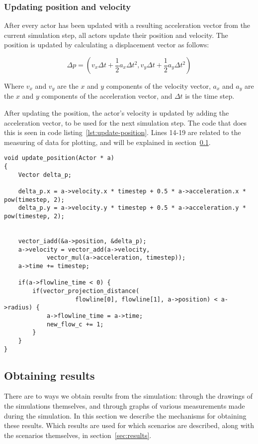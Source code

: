 \subsubsection{Updating position and velocity}
After every actor has been updated with a resulting acceleration vector from 
the current simulation step, all actors update their position and velocity.  
The position is updated by calculating a displacement vector as follows:

\begin{equation}
    \Delta p = (v_x \Delta t + \frac{1}{2}a_x \Delta t^2, v_y \Delta t + 
    \frac{1}{2}a_y \Delta t^2)
\end{equation}

Where $v_x$ and $v_y$ are the $x$ and $y$ components of the velocity vector, 
$a_x$ and $a_y$ are the $x$ and $y$ components of the acceleration vector, and 
$\Delta t$ is the time step.

After updating the position, the actor's velocity is updated by adding the 
acceleration vector, to be used for the next simulation step. The code that 
does this is seen in code listing~\ref{lst:update-position}. Lines 14-19 are 
related to the measuring of data for plotting, and will be explained in 
section~\ref{sec:measurement}.

\begin{lstlisting}[caption={Code updating the actor 
    position.},label=lst:update-position]
void update_position(Actor * a)
{
    Vector delta_p;

    delta_p.x = a->velocity.x * timestep + 0.5 * a->acceleration.x * pow(timestep, 2);
    delta_p.y = a->velocity.y * timestep + 0.5 * a->acceleration.y * pow(timestep, 2);


    vector_iadd(&a->position, &delta_p);
	a->velocity = vector_add(a->velocity,
			vector_mul(a->acceleration, timestep));
    a->time += timestep;

	if(a->flowline_time < 0) {
        if(vector_projection_distance(
					flowline[0], flowline[1], a->position) < a->radius) {
			a->flowline_time = a->time;
			new_flow_c += 1;
		}
	}
}
\end{lstlisting}

\subsection{Obtaining results}
\label{sec:measurement}
There are to ways we obtain results from the simulation: through the drawings 
of the simulations themselves, and through graphs of various measurements made 
during the simulation. In this section we describe the mechanisms for 
obtaining these results. Which results are used for which scenarios are 
described, along with the scenarios themselves, in section~\ref{sec:results}.

